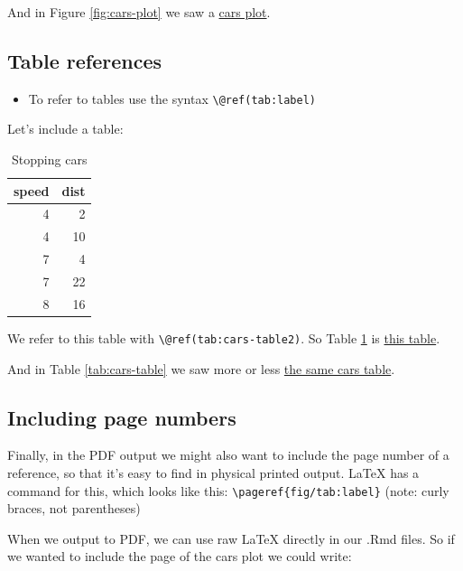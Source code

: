 \documentclass[a4paper, nobind]{templates/ociamthesis}
\providecommand{\tightlist}{%
  \setlength{\itemsep}{0pt}\setlength{\parskip}{0pt}}
\begin{document}
And in Figure \ref{fig:cars-plot} we saw a \protect\hyperlink{fig:cars-plot}{cars plot}.

\hypertarget{table-references-1}{%
\subsection{Table references}\label{table-references-1}}

\begin{itemize}
\tightlist
\item
  To refer to tables use the syntax \texttt{\textbackslash{}@ref(tab:label)}
\end{itemize}

Let's include a table:

\begin{table}

\caption{\label{tab:cars-table2}Stopping cars}
\centering
\begin{tabular}[t]{r|r}
\hline
speed & dist\\
\hline
4 & 2\\
\hline
4 & 10\\
\hline
7 & 4\\
\hline
7 & 22\\
\hline
8 & 16\\
\hline
\end{tabular}
\end{table}

We refer to this table with \texttt{\textbackslash{}@ref(tab:cars-table2)}.
So Table \ref{tab:cars-table2} is \protect\hyperlink{tab:cars-table2}{this table}.

And in Table \ref{tab:cars-table} we saw more or less \protect\hyperlink{tab:cars-table}{the same cars table}.

\hypertarget{including-page-numbers}{%
\subsection{Including page numbers}\label{including-page-numbers}}

Finally, in the PDF output we might also want to include the page number of a reference, so that it's easy to find in physical printed output.
LaTeX has a command for this, which looks like this: \texttt{\textbackslash{}pageref\{fig/tab:label\}} (note: curly braces, not parentheses)

When we output to PDF, we can use raw LaTeX directly in our .Rmd files. So if we wanted to include the page of the cars plot we could write:
\end{document}

